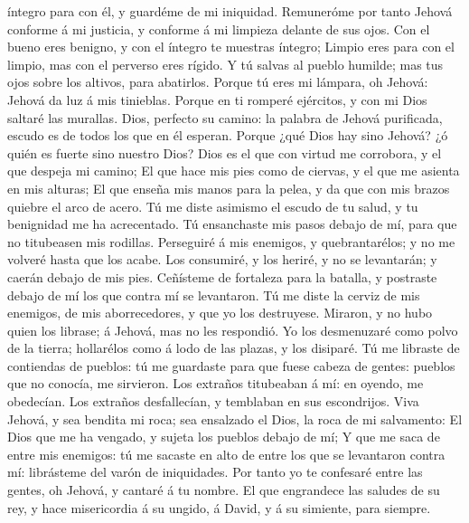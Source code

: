 íntegro para con él, y guardéme de mi iniquidad. 
Remuneróme por tanto Jehová conforme á mi justicia, y conforme á mi
limpieza delante de sus ojos.  Con el bueno eres benigno, y
con el íntegro te muestras íntegro;  Limpio eres para con
el limpio, mas con el perverso eres rígido.  Y tú salvas al
pueblo humilde; mas tus ojos sobre los altivos, para abatirlos.
 Porque tú eres mi lámpara, oh Jehová: Jehová da luz á mis
tinieblas.  Porque en ti romperé ejércitos, y con mi Dios
saltaré las murallas.  Dios, perfecto su camino: la palabra
de Jehová purificada, escudo es de todos los que en él esperan.
 Porque ¿qué Dios hay sino Jehová? ¿ó quién es fuerte sino
nuestro Dios?  Dios es el que con virtud me corrobora, y el
que despeja mi camino;  El que hace mis pies como de
ciervas, y el que me asienta en mis alturas;  El que enseña
mis manos para la pelea, y da que con mis brazos quiebre el arco de
acero.  Tú me diste asimismo el escudo de tu salud, y tu
benignidad me ha acrecentado.  Tú ensanchaste mis pasos
debajo de mí, para que no titubeasen mis rodillas. 
Perseguiré á mis enemigos, y quebrantarélos; y no me volveré hasta que
los acabe.  Los consumiré, y los heriré, y no se
levantarán; y caerán debajo de mis pies.  Ceñísteme de
fortaleza para la batalla, y postraste debajo de mí los que contra mí se
levantaron.  Tú me diste la cerviz de mis enemigos, de mis
aborrecedores, y que yo los destruyese.  Miraron, y no hubo
quien los librase; á Jehová, mas no les respondió.  Yo los
desmenuzaré como polvo de la tierra; hollarélos como á lodo de las
plazas, y los disiparé.  Tú me libraste de contiendas de
pueblos: tú me guardaste para que fuese cabeza de gentes: pueblos que no
conocía, me sirvieron.  Los extraños titubeaban á mí: en
oyendo, me obedecían.  Los extraños desfallecían, y
temblaban en sus escondrijos.  Viva Jehová, y sea bendita
mi roca; sea ensalzado el Dios, la roca de mi salvamento: 
El Dios que me ha vengado, y sujeta los pueblos debajo de mí;
 Y que me saca de entre mis enemigos: tú me sacaste en alto
de entre los que se levantaron contra mí: librásteme del varón de
iniquidades.  Por tanto yo te confesaré entre las gentes,
oh Jehová, y cantaré á tu nombre.  El que engrandece las
saludes de su rey, y hace misericordia á su ungido, á David, y á su
simiente, para siempre.

